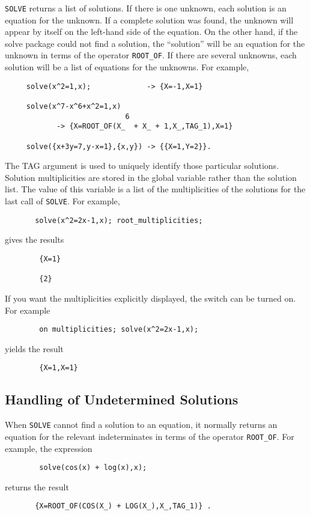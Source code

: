\hypertarget{operator:ROOT_OF}{}
\texttt{SOLVE} returns a list of solutions.  If there is one unknown, each
solution is an equation for the unknown.  If a complete solution was
found, the unknown will appear by itself on the left-hand side of the
equation.  On the other hand, if the solve package could not find a
solution, the ``solution'' will be an equation for the unknown in terms
of the operator \texttt{ROOT\_OF}. If there
are several unknowns, each solution will be a list of equations for the
unknowns.  For example,
\begin{verbatim}
     solve(x^2=1,x);             -> {X=-1,X=1}

     solve(x^7-x^6+x^2=1,x)
                            6
            -> {X=ROOT_OF(X_  + X_ + 1,X_,TAG_1),X=1}

     solve({x+3y=7,y-x=1},{x,y}) -> {{X=1,Y=2}}.
\end{verbatim}
\hypertarget{reserved:ROOT_MULTIPLICITIES}{}
The TAG argument is used to uniquely identify those particular solutions.
Solution multiplicities are stored in the global variable 
 rather than the solution list.  The value of this
variable is a list of the multiplicities of the solutions for the last
call of \texttt{SOLVE}.  For example,
\begin{verbatim}
       solve(x^2=2x-1,x); root_multiplicities;
\end{verbatim}
gives the results
\begin{verbatim}
        {X=1}

        {2}
\end{verbatim}

\hypertarget{switch:MULTIPLICITIES}{}
If you want the multiplicities explicitly displayed, the switch
 can be turned on. For example
\begin{verbatim}
        on multiplicities; solve(x^2=2x-1,x);
\end{verbatim}
yields the result
\begin{verbatim}
        {X=1,X=1}
\end{verbatim}

\subsection{Handling of Undetermined Solutions}
When \texttt{SOLVE} cannot find a solution to an equation, it normally
returns an equation for the relevant indeterminates in terms of the
operator \texttt{ROOT\_OF}.  For example, the expression
\begin{verbatim}
        solve(cos(x) + log(x),x);
\end{verbatim}
returns the result
\begin{verbatim}
       {X=ROOT_OF(COS(X_) + LOG(X_),X_,TAG_1)} .
\end{verbatim}

